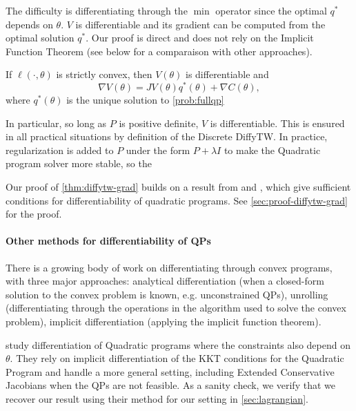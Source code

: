 The difficulty is differentiating through the $\min$ operator since the optimal $q^*$ depends on $\theta$. $V$ is differentiable and its gradient can be computed from the optimal solution $q^*$. Our proof is direct and does not rely on the Implicit Function Theorem (see below for a comparaison with other approaches).

\begin{theorem}\label{thm:diffytw-grad}
    If $\ell(\cdot, \theta)$ is strictly convex, then $V(\theta)$ is differentiable and
    \begin{equation}
        \nabla V(\theta) = JV(\theta)q^*(\theta) + \nabla C(\theta),
    \end{equation} where $q^*(\theta)$ is the unique solution to \cref{prob:fullqp}
\end{theorem}

In particular, so long as $P$ is positive definite, $V$ is differentiable. This is ensured in all practical situations by definition of the Discrete DiffyTW. In practice, regularization is added to $P$ under the form $P + \lambda I$ to make the Quadratic program solver more stable, so the

Our proof of \cref{thm:diffytw-grad} builds on a result from \cite{shapiro} and \cite{lee}, which give sufficient conditions for differentiability of quadratic programs. See \cref{sec:proof-diffytw-grad} for the proof.

\paragraph{Other methods for differentiability of QPs}
There is a growing body of work on differentiating through convex programs, with three major approaches: analytical differentiation (when a closed-form solution to the convex problem is known, e.g. unconstrained QPs), unrolling (differentiating through the operations in the algorithm used to solve the convex problem), implicit differentiation (applying the implicit function theorem).

\begin{remark}
    \cite{bambade,optnet,...} study differentiation of Quadratic programs where the constraints also depend on $\theta$. They rely on implicit differentiation of the KKT conditions for the Quadratic Program and handle a more general setting, including Extended Conservative Jacobians when the QPs are not feasible. As a sanity check, we verify that we recover our result using their method for our setting in \cref{sec:lagrangian}.
\end{remark}

